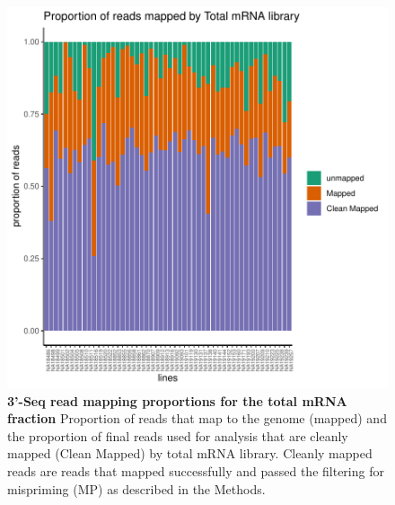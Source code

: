 \begin{figure}[!htb]
\centering
\includegraphics[width=5in]{img/ch02/Fig1_figuresupplement9.pdf}
\caption[3'-Seq read mapping proportions for the total mRNA fraction]{\textbf{3'-Seq read mapping proportions for the total mRNA fraction} Proportion of reads that map to the genome (mapped) and the proportion of final reads used for analysis that are cleanly mapped (Clean Mapped) by total mRNA library. Cleanly mapped reads are reads that mapped successfully and passed the filtering for mispriming (MP) as described in the Methods.}
\label{fig:TotalMap}
\end{figure}
\clearpage

